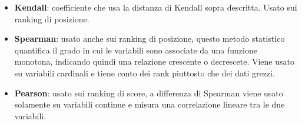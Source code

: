 \begin{itemize}
	\item \textbf{Kendall}: coefficiente che usa la distanza di Kendall sopra descritta. Usato sui ranking di posizione.
	\item \textbf{Spearman}: usato anche sui ranking di posizione, questo metodo statistico quantifica il grado in cui le variabili sono associate da una funzione monotona, indicando quindi una relazione crescente o decrescete. Viene usato su variabili cardinali e tiene conto dei rank piuttosto che dei dati grezzi.
	\item \textbf{Pearson}: usato sui ranking di score, a differenza di Spearman viene usato solamente su variabili continue e misura una correlazione lineare tra le due variabili.
\end{itemize}
